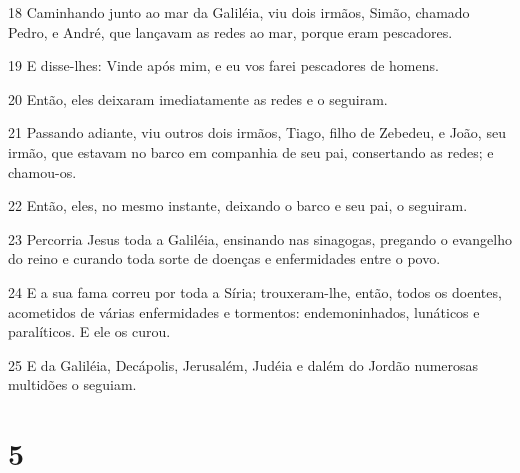\par 18 Caminhando junto ao mar da Galiléia, viu dois irmãos, Simão, chamado Pedro, e André, que lançavam as redes ao mar, porque eram pescadores.
\par 19 E disse-lhes: Vinde após mim, e eu vos farei pescadores de homens.
\par 20 Então, eles deixaram imediatamente as redes e o seguiram.
\par 21 Passando adiante, viu outros dois irmãos, Tiago, filho de Zebedeu, e João, seu irmão, que estavam no barco em companhia de seu pai, consertando as redes; e chamou-os.
\par 22 Então, eles, no mesmo instante, deixando o barco e seu pai, o seguiram.
\par 23 Percorria Jesus toda a Galiléia, ensinando nas sinagogas, pregando o evangelho do reino e curando toda sorte de doenças e enfermidades entre o povo.
\par 24 E a sua fama correu por toda a Síria; trouxeram-lhe, então, todos os doentes, acometidos de várias enfermidades e tormentos: endemoninhados, lunáticos e paralíticos. E ele os curou.
\par 25 E da Galiléia, Decápolis, Jerusalém, Judéia e dalém do Jordão numerosas multidões o seguiam.

\chapter{5}

